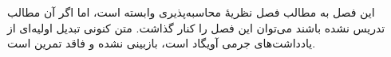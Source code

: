 \documentclass[../../../include/open-logic-chapter]{subfiles}
\begin{document}
\begin{editorial}
  این فصل به مطالب فصل نظریهٔ محاسبه‌پذیری وابسته است، اما اگر آن
  مطالب تدریس نشده باشند می‌توان این فصل را کنار گذاشت. متن کنونی
  تبدیل اولیه‌ای از یادداشت‌های جرمی آویگاد است، بازبینی نشده و فاقد
  تمرین است.
\end{editorial}












\OLEndChapterHook
\end{document}
